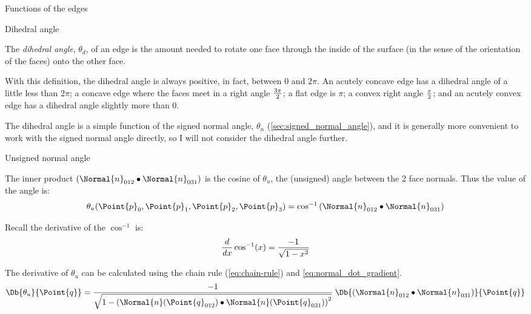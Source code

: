 \begin{plSection}{Functions of the edges}
\begin{plSection}{Dihedral angle}
\label{sec:Dihedral-angle}

The {\it dihedral angle},
$\theta_d$,
 of an edge is the amount
needed to rotate one face
through the inside of the surface
(in the sense of the orientation of the faces)
onto the other face.

With this definition, the dihedral angle is always
positive, in fact, between $0$ and $2\pi$.
An acutely concave edge has a dihedral angle
of a little less than $2\pi$;
a concave edge where the faces meet in a right angle
${3\pi} \over 2$;
a flat edge is $\pi$;
a convex right angle $\pi \over 2$;
and an acutely convex edge has a dihedral angle
slightly more than $0$.

The dihedral angle is a simple function of the
signed normal angle, $\theta_n$
(\autoref{sec:signed_normal_angle}),
and it is generally more convenient to work
with the signed normal angle directly,
so I will not consider the dihedral angle further.

\end{plSection}%

\begin{plSection}{Unsigned normal angle}
\label{sec:unsigned_normal_angle}

The inner product $\left( \Normal{n}_{012} \bullet \Normal{n}_{031} \right)$
is the cosine of $\theta_u$,
the (unsigned) angle between the 2 face normals.
Thus the value of the angle is:
\begin{equation}
\theta_u(\Point{p}_0,\Point{p}_1,\Point{p}_2,\Point{p}_3)
= \cos^{-1} \left( \Normal{n}_{012} \bullet \Normal{n}_{031} \right)
\end{equation}

Recall the derivative of the $\cos^{-1}$ is:
\begin{equation}
\frac{d}{\mathit dx} \cos^{-1}(x) = { -1 \over \sqrt{1 - x^2} }
\end{equation}

The derivative of $\theta_u$ can be calculated using the chain rule
(\cref{eq:chain-rule}) and \cref{eq:normal_dot_gradient}.
\begin{equation}
\Db{\theta_u}{\Point{q}}
 = { -1 \over \sqrt{1 - \left( \Normal{n}(\Point{q}_{012}) \bullet \Normal{n}(\Point{q}_{031}) \right)^2} }
\; \Db{\left( \Normal{n}_{012} \bullet \Normal{n}_{031} \right)}{\Point{q}}
\end{equation}


\end{plSection}
\end{plSection}
